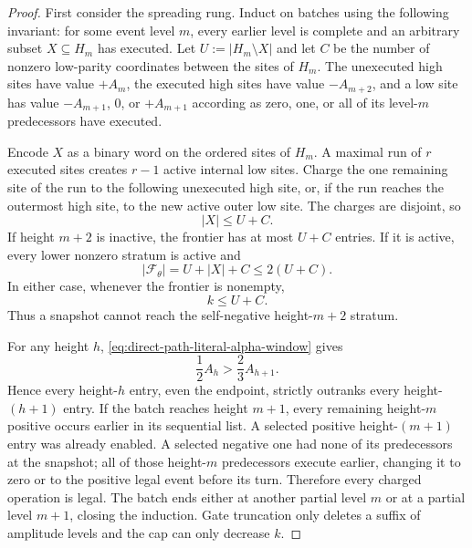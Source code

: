 \begin{proof}
First consider the spreading rung.  Induct on batches using the following
invariant: for some event level $m$, every earlier level is complete and an
arbitrary subset $X\subseteq H_m$ has executed.  Let
$U:=|H_m\setminus X|$ and let $C$ be the number of nonzero low-parity
coordinates between the sites of $H_m$.  The unexecuted high sites have
value $+A_m$, the executed high sites have value $-A_{m+2}$, and a low site
has value $-A_{m+1}$, $0$, or $+A_{m+1}$ according as zero, one, or all of
its level-$m$ predecessors have executed.

Encode $X$ as a binary word on the ordered sites of $H_m$.  A maximal run of
$r$ executed sites creates $r-1$ active internal low sites.  Charge the one
remaining site of the run to the following unexecuted high site, or, if the
run reaches the outermost high site, to the new active outer low site.  The
charges are disjoint, so
\begin{equation}
 |X|\leq U+C.
 \label{eq:direct-path-partial-layer-count}
\end{equation}
If height $m+2$ is inactive, the frontier has at most $U+C$ entries.  If it
is active, every lower nonzero stratum is active and
\begin{equation*}
 |\mathcal F_\theta|=U+|X|+C\leq2(U+C).
\end{equation*}
In either case, whenever the frontier is nonempty,
\begin{equation}
 k\leq U+C.
 \label{eq:direct-path-batch-does-not-reach-self-negative}
\end{equation}
Thus a snapshot cannot reach the self-negative height-$m+2$ stratum.

For any height $h$, \cref{eq:direct-path-literal-alpha-window} gives
\begin{equation}
 \frac12A_h>\frac23A_{h+1}.
 \label{eq:direct-path-cross-height-rank}
\end{equation}
Hence every height-$h$ entry, even the endpoint, strictly outranks every
height-$(h+1)$ entry.  If the batch reaches height $m+1$, every remaining
height-$m$ positive occurs earlier in its sequential list.  A selected
positive height-$(m+1)$ entry was already enabled.  A selected negative one
had none of its predecessors at the snapshot; all of those height-$m$
predecessors execute earlier, changing it to zero or to the positive legal
event before its turn.  Therefore every charged operation is legal.  The
batch ends either at another partial level $m$ or at a partial level $m+1$,
closing the induction.  Gate truncation only deletes a suffix of amplitude
levels and the cap can only decrease $k$.


\end{proof}

